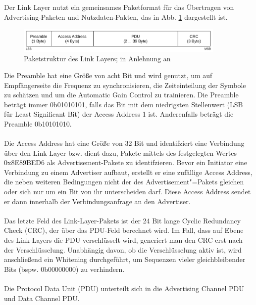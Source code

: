 Der Link Layer nutzt ein gemeinsames Paketformat für das Übertragen von Advertising-Paketen und Nutzdaten-Pakten, das in Abb. \ref{fig: ll paket struktur} dargestellt ist.\\

\begin{figure}[H]
    \centering
    \includegraphics[width=0.9\textwidth]{graphics/link_layer_packetformat.pdf}
    \caption[Paketstruktur des Link Layers]{Paketstruktur des Link Layers; in Anlehnung an \cite{BtSpec4.0_fig_2200}}
    \label{fig: ll paket struktur}
\end{figure}

Die Preamble hat eine Größe von acht Bit und wird genutzt, um auf Empfängerseite die Frequenz zu synchronisieren, die Zeiteinteilung der Symbole zu schätzen und um die Automatic Gain Control zu trainieren. Die Preamble beträgt immer 0b01010101, falls das Bit mit dem niedrigsten Stellenwert (LSB für Least Significant Bit) der Access Address 1 ist. Anderenfalls beträgt die Preamble 0b10101010. \cite{BtSpec4.0_2200-2201}
\\\\
Die Access Address hat eine Größe von 32 Bit und identifziert eine Verbindung über den Link Layer bzw. dient dazu, Pakete mittels des festgelegten Wertes 0x8E89BED6 als Advertisement-Pakete zu identifzieren. Bevor ein Initiator eine Verbindung zu einem Advertiser aufbaut, erstellt er eine zufällige Access Address, die neben weiteren Bedingungen nicht der des Advertisement"=Pakets gleichen oder sich nur um ein Bit von ihr unterscheiden darf. Diese Access Address sendet er dann innerhalb der Verbindungsanfrage an den Advertiser. \cite{BtSpec4.0_2200-2201}
\\\\
Das letzte Feld des Link-Layer-Pakets ist der 24 Bit lange Cyclic Redundancy Check (CRC), der über das PDU-Feld berechnet wird. Im Fall, dass auf Ebene des Link Layers die PDU verschlüsselt wird, generiert man den CRC erst nach der Verschlüsselung. Unabhängig davon, ob die Verschlüsselung aktiv ist, wird anschließend ein Whitening \cite{BtSpec4.0_2217-2218} durchgeführt, um Sequenzen vieler gleichbleibender Bits (bspw. 0b00000000) zu verhindern. \cite{BtSpec4.0_2200-2201}
\\\\
Die Protocol Data Unit (PDU) unterteilt sich in die Advertising Channel PDU und Data Channel PDU.

